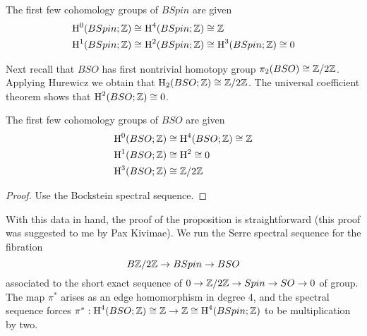 \documentclass{amsart}
\begin{document}
\begin{lemma}
    The first few cohomology groups of $BSpin$ are given
    \begin{align*}
        \operatorname{H}^0(BSpin;\mathbb{Z}) &\cong \operatorname{H}^4(BSpin;\mathbb{Z}) \cong \mathbb{Z}\\
        \operatorname{H}^1(BSpin;\mathbb{Z}) &\cong \operatorname{H}^2(BSpin;\mathbb{Z})  \cong \operatorname{H}^3(BSpin;\mathbb{Z}) \cong 0
    \end{align*}
\end{lemma}

Next recall that $BSO$ has first nontrivial homotopy group $\pi_2(BSO)\cong\mathbb{Z}/2\mathbb{Z}$.
Applying Hurewicz we obtain that $\operatorname{H}_2(BSO;\mathbb{Z})\cong\mathbb{Z}/2\mathbb{Z}$.
The universal coefficient theorem shows that $\operatorname{H}^2(BSO;\mathbb{Z})\cong0$.

\begin{lemma}
    The first few cohomology groups of $BSO$ are given
    \begin{align*}
        \operatorname{H}^0(BSO;\mathbb{Z}) & \cong \operatorname{H}^4(BSO;\mathbb{Z}) \cong \mathbb{Z}\\
        \operatorname{H}^1(BSO;\mathbb{Z}) & \cong \operatorname{H}^2 \cong 0\\
        \operatorname{H}^3(BSO;\mathbb{Z}) & \cong \mathbb{Z}/2\mathbb{Z}
    \end{align*}
\end{lemma}
\begin{proof}
    Use the Bockstein spectral sequence.
\end{proof}

With this data in hand, the proof of the proposition is straightforward (this proof was
suggested to me by Pax Kivimae). We run the Serre spectral sequence for the fibration
\begin{equation*}
    B\mathbb{Z}/2\mathbb{Z} \to BSpin \to BSO
\end{equation*}
associated to the short exact sequence of $0\to\mathbb{Z}/2\mathbb{Z}\to Spin\to SO\to0$ of group. The map
$\pi^*$ arises as an edge homomorphism in degree 4, and the spectral sequence forces
$\pi^*:\operatorname{H}^4(BSO;\mathbb{Z})\cong \mathbb{Z} \to \mathbb{Z}\cong \operatorname{H}^4(BSpin;\mathbb{Z})$ to be multiplication by two.
\end{document}
